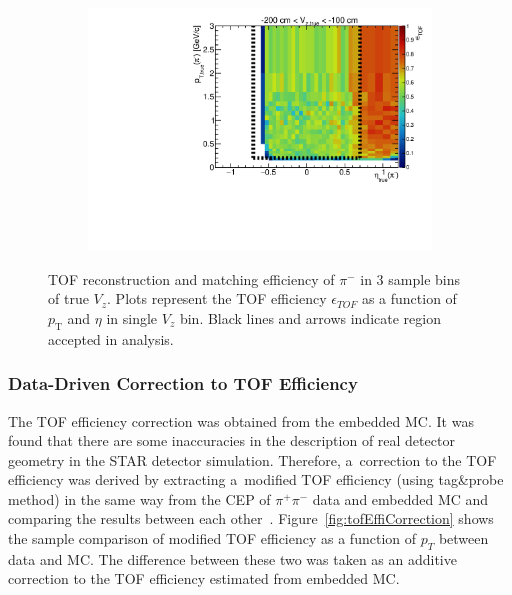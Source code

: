 \begin{figure}[h!]
\begin{subfigure}{.49\textwidth}
		\includegraphics[width=\textwidth,page=18]{chapters/chrgSTAR/img/tofEff/Eff2D_TOF_pion_Minus.pdf}
	\end{subfigure}
	\begin{minipage}{.49\textwidth}
		\caption{TOF reconstruction and matching efficiency of $\pi^-$ in 3 sample bins of true $V_z$. Plots represent the TOF efficiency $\epsilon_{ TOF}$ as a function of $p_\textrm{T}$ and $\eta$ in single $V_z$ bin. Black lines and arrows indicate region accepted in analysis.}
		\label{fig:tofEffi}
	\end{minipage}
	
\end{figure}

\subsubsection{Data-Driven Correction to TOF Efficiency}
The TOF efficiency correction was obtained from the embedded MC. It was found that there are some inaccuracies in the description of real detector geometry in the STAR detector simulation. Therefore,  a~correction to the TOF efficiency was derived  by extracting  a~modified TOF efficiency  (using  tag\&probe method)  in the  same way from the \ac{CEP} of $\pi^+\pi^-$ data and embedded MC and comparing the results between each other~\cite{RafalThesis}. Figure~\ref{fig:tofEffiCorrection} shows the sample comparison of modified TOF efficiency as a function of $p_T$ between data and MC. The difference between these two was taken as an additive correction to the TOF efficiency estimated from embedded MC.

